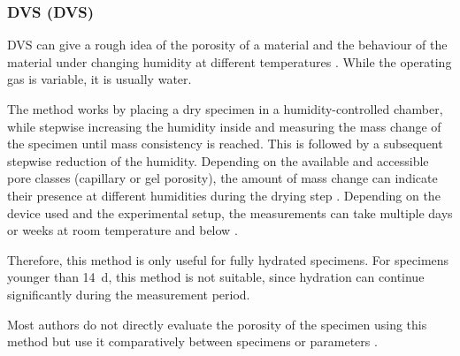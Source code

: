 \subsubsection{\Acl*{DVS} (\acs*{DVS})}

\Ac{DVS} can give a rough idea of the porosity of a material \cite{pinson.2015} and the behaviour of the material under changing humidity at different temperatures \cite{wang.2023}.
While the operating gas is variable, it is usually water.

The method works by placing a dry specimen in a humidity-controlled chamber, while stepwise increasing the humidity inside and measuring the mass change of the specimen until mass consistency is reached.
This is followed by a subsequent stepwise reduction of the humidity.
Depending on the available and accessible pore classes (capillary or gel porosity), the amount of mass change can indicate their presence at different humidities during the drying step \cite{pinson.2015}.
Depending on the device used and the experimental setup, the measurements can take multiple days or weeks at room temperature and below \cite{wang.2023}.

Therefore, this method is only useful for fully hydrated specimens.
For specimens younger than \qty{14}{\day}, this method is not suitable, since hydration can continue significantly during the measurement period.

Most authors do not directly evaluate the porosity of the specimen using this method but use it comparatively between specimens or parameters \cite{ghantous.2023, wang.2023}.
